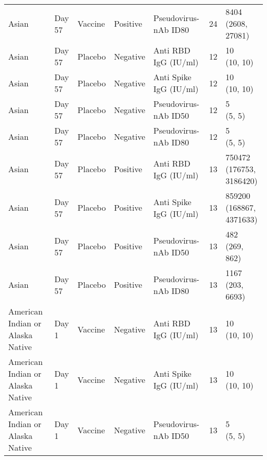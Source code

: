 \documentclass[]{book}
\theoremstyle{definition}
\theoremstyle{definition}
\theoremstyle{definition}
\newcommand{\1}{\mathbbm{1}}
\begin{document}
\begin{landscape}
\begin{ThreePartTable}
\begin{longtable}[t]{>{\raggedright\arraybackslash}p{7cm}llllll}
\hspace{1em}Asian & Day 57 & Vaccine & Positive & Pseudovirus-nAb ID80 & 24 & \makecell[l]{8404\\(2608, 27081)}\\
\hspace{1em}Asian & Day 57 & Placebo & Negative & Anti RBD IgG (IU/ml) & 12 & \makecell[l]{10\\(10, 10)}\\
\hspace{1em}Asian & Day 57 & Placebo & Negative & Anti Spike IgG (IU/ml) & 12 & \makecell[l]{10\\(10, 10)}\\
\hspace{1em}Asian & Day 57 & Placebo & Negative & Pseudovirus-nAb ID50 & 12 & \makecell[l]{5\\(5, 5)}\\
\hspace{1em}Asian & Day 57 & Placebo & Negative & Pseudovirus-nAb ID80 & 12 & \makecell[l]{5\\(5, 5)}\\
\hspace{1em}Asian & Day 57 & Placebo & Positive & Anti RBD IgG (IU/ml) & 13 & \makecell[l]{750472\\(176753, 3186420)}\\
\hspace{1em}Asian & Day 57 & Placebo & Positive & Anti Spike IgG (IU/ml) & 13 & \makecell[l]{859200\\(168867, 4371633)}\\
\hspace{1em}Asian & Day 57 & Placebo & Positive & Pseudovirus-nAb ID50 & 13 & \makecell[l]{482\\(269, 862)}\\
\hspace{1em}Asian & Day 57 & Placebo & Positive & Pseudovirus-nAb ID80 & 13 & \makecell[l]{1167\\(203, 6693)}\\
\hspace{1em}American Indian or Alaska Native & Day 1 & Vaccine & Negative & Anti RBD IgG (IU/ml) & 13 & \makecell[l]{10\\(10, 10)}\\
\hspace{1em}American Indian or Alaska Native & Day 1 & Vaccine & Negative & Anti Spike IgG (IU/ml) & 13 & \makecell[l]{10\\(10, 10)}\\
\hspace{1em}American Indian or Alaska Native & Day 1 & Vaccine & Negative & Pseudovirus-nAb ID50 & 13 & \makecell[l]{5\\(5, 5)}\\

\end{longtable}
\end{ThreePartTable}
\end{landscape}
\end{document}

